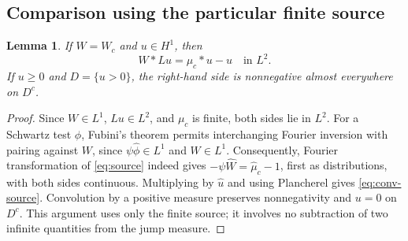 \documentclass[11pt,a4paper]{article}
\newtheorem{lemma}[theorem]{Lemma}
\theoremstyle{definition}\newtheorem{definition}[theorem]{Definition}
\theoremstyle{remark}\newtheorem{remark}[theorem]{Remark}
\begin{document}
\subsection{Comparison using the particular finite source}
\begin{lemma}\label{lem:finite-source}
If $W=W_c$ and $u\in H^1$, then
\begin{equation}\label{eq:conv-source}
 W*Lu=\mu_c*u-u\quad\text{in }L^2.
\end{equation}
If $u\ge0$ and $D=\{u>0\}$, the right-hand side is nonnegative almost everywhere on $D^c$.
\end{lemma}
\begin{proof}
Since $W\in L^1$, $Lu\in L^2$, and $\mu_c$ is finite, both sides lie in $L^2$. For a Schwartz test $\phi$, Fubini's theorem permits interchanging Fourier inversion with pairing against $W$, since $\psi\widehat\phi\in L^1$ and $W\in L^1$. Consequently, Fourier transformation of \eqref{eq:source} indeed gives
$-\psi\widehat W=\widehat\mu_c-1$, first as distributions, with both sides continuous. Multiplying by $\widehat u$ and using Plancherel gives \eqref{eq:conv-source}. Convolution by a positive measure preserves nonnegativity and $u=0$ on $D^c$. This argument uses only the finite source; it involves no subtraction of two infinite quantities from the jump measure.
\end{proof}
\end{document}
